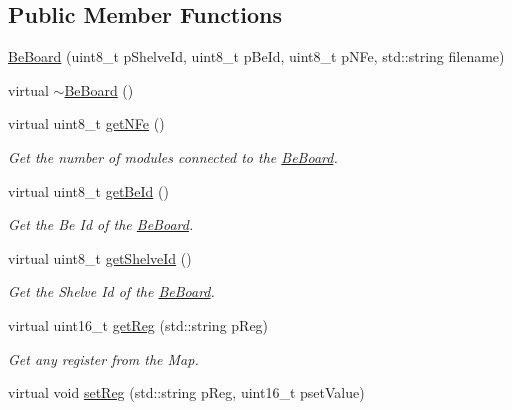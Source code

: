 \subsection*{Public Member Functions}
\begin{DoxyCompactItemize}
\item 
\hyperlink{class_ph2___hw_description_1_1_be_board_a57482a66173fb76260272c973ce72c9f}{Be\-Board} (uint8\-\_\-t p\-Shelve\-Id, uint8\-\_\-t p\-Be\-Id, uint8\-\_\-t p\-N\-Fe, std\-::string filename)
\item 
virtual \hyperlink{class_ph2___hw_description_1_1_be_board_a8ab3ac3c6f3aac002c33ef458779845e}{$\sim$\-Be\-Board} ()
\item 
virtual uint8\-\_\-t \hyperlink{class_ph2___hw_description_1_1_be_board_acee42e119fd170dd4291825b10a30436}{get\-N\-Fe} ()
\begin{DoxyCompactList}\small\item\em Get the number of modules connected to the \hyperlink{class_ph2___hw_description_1_1_be_board}{Be\-Board}. \end{DoxyCompactList}\item 
virtual uint8\-\_\-t \hyperlink{class_ph2___hw_description_1_1_be_board_a54e7ce5a90312b4b71f2af9d88e90dbb}{get\-Be\-Id} ()
\begin{DoxyCompactList}\small\item\em Get the Be Id of the \hyperlink{class_ph2___hw_description_1_1_be_board}{Be\-Board}. \end{DoxyCompactList}\item 
virtual uint8\-\_\-t \hyperlink{class_ph2___hw_description_1_1_be_board_addc30268e0f48b5a1408fd261d080f03}{get\-Shelve\-Id} ()
\begin{DoxyCompactList}\small\item\em Get the Shelve Id of the \hyperlink{class_ph2___hw_description_1_1_be_board}{Be\-Board}. \end{DoxyCompactList}\item 
virtual uint16\-\_\-t \hyperlink{class_ph2___hw_description_1_1_be_board_ac25f4182e6340ca29d42ba9b861d8e67}{get\-Reg} (std\-::string p\-Reg)
\begin{DoxyCompactList}\small\item\em Get any register from the Map. \end{DoxyCompactList}\item 
virtual void \hyperlink{class_ph2___hw_description_1_1_be_board_a933f9d5f715fbe9187f6aa79589cb55c}{set\-Reg} (std\-::string p\-Reg, uint16\-\_\-t pset\-Value)

\end{DoxyCompactItemize}

